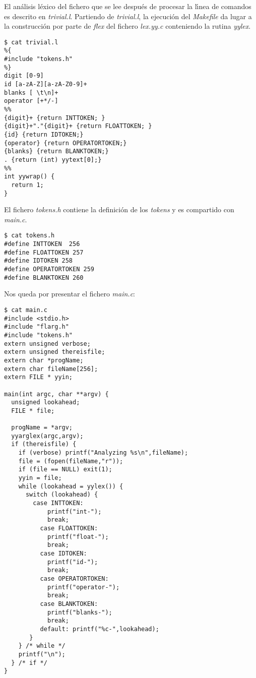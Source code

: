 El an\'alisis l\'exico del fichero que se lee despu\'es de procesar la
l\'{\i}nea de comandos es descrito en \emph{trivial.l}.
Partiendo de \emph{trivial.l}, la ejecuci\'on del \emph{Makefile}
da lugar a la construcci\'on por parte de \emph{flex} del fichero 
\emph{lex.yy.c} conteniendo la rutina \emph{yylex}.
\begin{verbatim}
$ cat trivial.l
%{
#include "tokens.h"
%}
digit [0-9]
id [a-zA-Z][a-zA-Z0-9]+
blanks [ \t\n]+
operator [+*/-]
%%
{digit}+ {return INTTOKEN; }
{digit}+"."{digit}+ {return FLOATTOKEN; }
{id} {return IDTOKEN;}
{operator} {return OPERATORTOKEN;}
{blanks} {return BLANKTOKEN;}
. {return (int) yytext[0];}
%%
int yywrap() {
  return 1;
}
\end{verbatim}
El fichero \emph{tokens.h} contiene la definici\'on de los \emph{tokens}
y es compartido con \emph{main.c}. 
\begin{verbatim}
$ cat tokens.h
#define INTTOKEN  256
#define FLOATTOKEN 257
#define IDTOKEN 258
#define OPERATORTOKEN 259
#define BLANKTOKEN 260         
\end{verbatim}
Nos queda por presentar el fichero \emph{main.c}:
\begin{verbatim}
$ cat main.c
#include <stdio.h>
#include "flarg.h"
#include "tokens.h"
extern unsigned verbose;
extern unsigned thereisfile;
extern char *progName;
extern char fileName[256];
extern FILE * yyin;
 
main(int argc, char **argv) {
  unsigned lookahead;
  FILE * file;
 
  progName = *argv;
  yyarglex(argc,argv);
  if (thereisfile) {
    if (verbose) printf("Analyzing %s\n",fileName);
    file = (fopen(fileName,"r"));
    if (file == NULL) exit(1);
    yyin = file;
    while (lookahead = yylex()) {
      switch (lookahead) {
        case INTTOKEN:
            printf("int-");
            break;
          case FLOATTOKEN:
            printf("float-");
            break;
          case IDTOKEN:
            printf("id-");
            break;
          case OPERATORTOKEN:
            printf("operator-");
            break;
          case BLANKTOKEN:
            printf("blanks-");
            break;
          default: printf("%c-",lookahead);
       }
    } /* while */
    printf("\n");
  } /* if */
}                                       
\end{verbatim}

